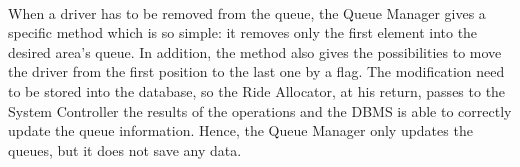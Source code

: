 \documentclass[\mainpath/main]{subfiles}
\begin{document}
\\[0.5cm]
	
When a driver has to be removed from the queue, the Queue Manager gives a specific method which is so simple: it removes only the first element into the desired area's queue. In addition, the method also gives the possibilities to move the driver from the first position to the last one by a flag. The modification need to be stored into the database, so the Ride Allocator, at his return, passes to the System Controller the results of the operations and the DBMS is able to correctly update the queue information. Hence, the Queue Manager only updates the queues, but it does not save any data.\\

\\[0.5cm]
\end{document}
